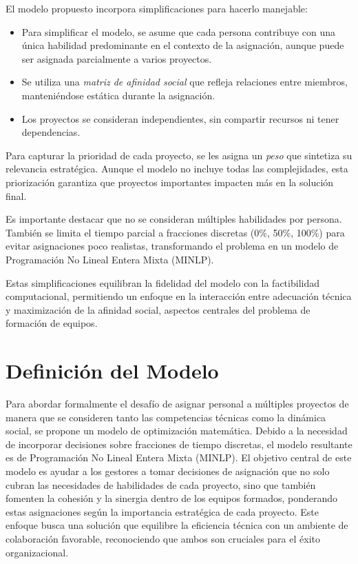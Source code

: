 \documentclass[conference]{IEEEtran}
\begin{document}
El modelo propuesto incorpora simplificaciones para hacerlo manejable:
\begin{itemize}
    \item Para simplificar el modelo, se asume que cada persona contribuye con una única habilidad predominante en el contexto de la asignación, aunque puede ser asignada parcialmente a varios proyectos.
    \item Se utiliza una \textit{matriz de afinidad social} \cite{gutierrez2016multiple} que refleja relaciones entre miembros, manteniéndose estática durante la asignación.
    \item Los proyectos se consideran independientes, sin compartir recursos ni tener dependencias.
\end{itemize}

Para capturar la prioridad de cada proyecto, se les asigna un \textit{peso} que sintetiza su relevancia estratégica. Aunque el modelo no incluye todas las complejidades, esta priorización garantiza que proyectos importantes impacten más en la solución final.

Es importante destacar que no se consideran múltiples habilidades por persona. También se limita el tiempo parcial a fracciones discretas (0\%, 50\%, 100\%) para evitar asignaciones poco realistas, transformando el problema en un modelo de Programación No Lineal Entera Mixta (MINLP).

Estas simplificaciones equilibran la fidelidad del modelo con la factibilidad computacional, permitiendo un enfoque en la interacción entre adecuación técnica y maximización de la afinidad social, aspectos centrales del problema de formación de equipos.

\section{Definición del Modelo}

Para abordar formalmente el desafío de asignar personal a múltiples proyectos de manera que se consideren tanto las competencias técnicas como la dinámica social, se propone un modelo de optimización matemática. Debido a la necesidad de incorporar decisiones sobre fracciones de tiempo discretas, el modelo resultante es de Programación No Lineal Entera Mixta (MINLP). El objetivo central de este modelo es ayudar a los gestores a tomar decisiones de asignación que no solo cubran las necesidades de habilidades de cada proyecto, sino que también fomenten la cohesión y la sinergia dentro de los equipos formados, ponderando estas asignaciones según la importancia estratégica de cada proyecto. Este enfoque busca una solución que equilibre la eficiencia técnica con un ambiente de colaboración favorable, reconociendo que ambos son cruciales para el éxito organizacional.
\end{document}
